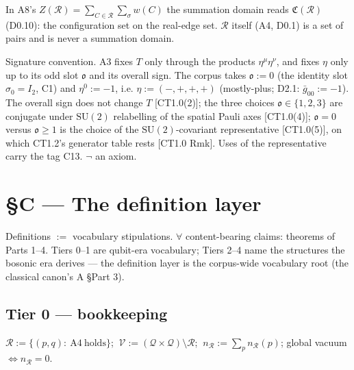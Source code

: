 \begin{convention}[{\texorpdfstring{C12}{C12}}]\label{tag:C12}
In A8's $Z(\mathcal R)=\sum_{C\in\mathcal R}\sum_\sigma w(C)$ the summation domain reads $\mathfrak C(\mathcal R)$ (D0.10): the configuration set on the real-edge set. $\mathcal R$ itself (A4, D0.1) is a set of pairs and is never a summation domain.

\end{convention}

\begin{convention}[{\texorpdfstring{C13}{C13}}]\label{tag:C13}
Signature convention. A3 fixes $T$ only through the products $\eta^\mu\eta^\nu$, and fixes $\eta$ only up to its odd slot $\mathfrak o$ and its overall sign. The corpus takes $\mathfrak o:=0$ (the identity slot $\sigma_0=I_2$, C1) and $\eta^{0}:=-1$, i.e. $\eta:=(-,+,+,+)$ (mostly-plus; D2.1: $\bar g_{00}:=-1$). The overall sign does not change $T$ [CT1.0(2)]; the three choices $\mathfrak o\in\{1,2,3\}$ are conjugate under $\mathrm{SU}(2)$ relabelling of the spatial Pauli axes [CT1.0(4)]; $\mathfrak o=0$ versus $\mathfrak o\ge1$ is the choice of the $\mathrm{SU}(2)$-covariant representative [CT1.0(5)], on which CT1.2's generator table rests [CT1.0 Rmk]. Uses of the representative carry the tag C13. $\neg$ an axiom.

\end{convention}

\section[§C — The definition layer]{\texorpdfstring{§C — The definition layer}{SC - The definition layer}}

Definitions $:=$ vocabulary stipulations. $\forall$ content-bearing claims: theorems of Parts 1–4. Tiers 0–1 are qubit-era vocabulary; Tiers 2–4 name the structures the bosonic era derives — the definition layer is the corpus-wide vocabulary root (the classical canon's A §Part 3).

\subsection[Tier 0 — bookkeeping]{\texorpdfstring{Tier 0 — bookkeeping}{Tier 0 - bookkeeping}}

\begin{definition}[{\texorpdfstring{D0.1}{D0.1}}]\label{tag:D0-1}
$\mathcal R:=\{(p,q):\ \mathrm{A4}\ \text{holds}\}$; $\ \mathcal V:=(\mathcal Q\times\mathcal Q)\setminus\mathcal R$; $\ n_{\mathcal R}:=\sum_p n_{\mathcal R}(p)$; global vacuum $\iff n_{\mathcal R}=0$.

\end{definition}

